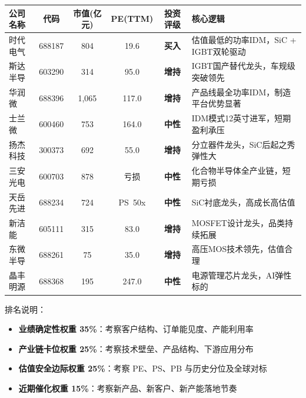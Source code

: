\begin{exhibitbox}[表 1-1：推荐组合与评级一览]
\centering
\small
\begin{tabularx}{\textwidth}{l c c c c X}
\toprule
\textbf{公司名称} & \textbf{代码} & \textbf{市值(亿元)} & \textbf{PE(TTM)} & \textbf{投资评级} & \textbf{核心逻辑} \\
\midrule
时代电气 & 688187 & 804 & 19.6 & \textcolor{riskgreen}{\textbf{买入}} & 估值最低的功率IDM，SiC + IGBT双轮驱动 \\
斯达半导 & 603290 & 314 & 95.0 & \textcolor{riskgreen}{\textbf{增持}} & IGBT国产替代龙头，车规级突破领先 \\
华润微 & 688396 & 1,065 & 117.0 & \textcolor{riskgreen}{\textbf{增持}} & 产品线最全功率IDM，制造平台优势显著 \\
士兰微 & 600460 & 753 & 164.0 & \textcolor{riskamber}{\textbf{中性}} & IDM模式12英寸进军，短期盈利承压 \\
扬杰科技 & 300373 & 692 & 55.0 & \textcolor{riskgreen}{\textbf{增持}} & 分立器件龙头，SiC后起之秀弹性大 \\
三安光电 & 600703 & 878 & 亏损 & \textcolor{riskamber}{\textbf{中性}} & 化合物半导体全产业链，短期亏损 \\
天岳先进 & 688234 & 724 & PS~50x & \textcolor{riskamber}{\textbf{中性}} & SiC衬底龙头，高成长高估值 \\
新洁能 & 605111 & 315 & 83.0 & \textcolor{riskgreen}{\textbf{增持}} & MOSFET设计龙头，品类持续拓展 \\
东微半导 & 688261 & 75 & 35.0 & \textcolor{riskgreen}{\textbf{增持}} & 高压MOS技术领先，估值合理 \\
晶丰明源 & 688368 & 195 & 247.0 & \textcolor{riskamber}{\textbf{中性}} & 电源管理芯片龙头，AI弹性标的 \\
\bottomrule
\end{tabularx}
\end{exhibitbox}

排名说明：
\begin{itemize}[leftmargin=2em, topsep=0pt]
\item \textbf{业绩确定性权重 35\%}：考察客户结构、订单能见度、产能利用率
\item \textbf{产业链卡位权重 25\%}：考察技术壁垒、产品结构、下游应用分布
\item \textbf{估值安全边际权重 25\%}：考察 PE、PS、PB 与历史分位及全球对标
\item \textbf{近期催化权重 15\%}：考察新产品、新客户、新产能落地节奏
\end{itemize}

